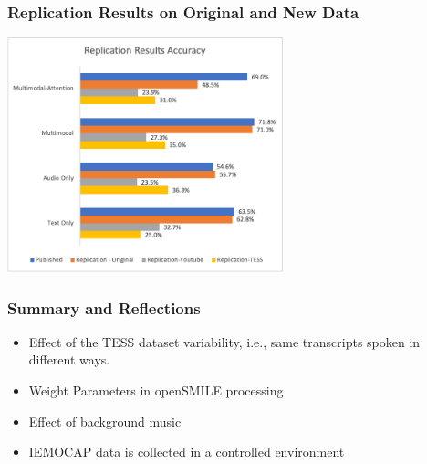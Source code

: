 \documentclass{beamer}
\begin{document}
\begin{frame}
\frametitle{Replication Results on Original and New Data}
\begin{center}
    \includegraphics[width=8cm]{images/replication_results.png}
\end{center}
\end{frame}

\begin{frame}[fragile]
  \frametitle{Summary and Reflections}


  \begin{itemize}
\item Effect of the TESS dataset variability, i.e., same transcripts spoken in different ways.
 \item	Weight Parameters in openSMILE processing
\item Effect of background music
\item IEMOCAP data is collected in a controlled environment


  \end{itemize}


\end{frame}
\end{document}
